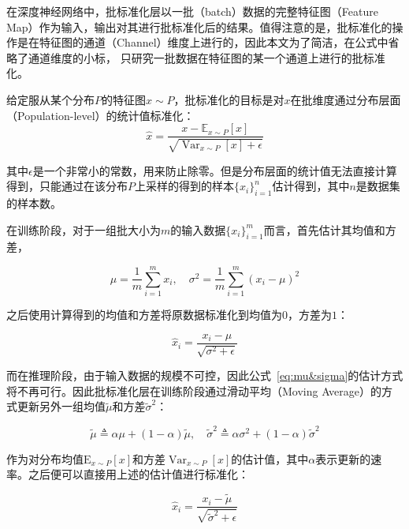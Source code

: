 在深度神经网络中，批标准化层以一批（batch）数据的完整特征图（Feature Map）作为输入，输出对其进行批标准化后的结果。值得注意的是，批标准化的操作是在特征图的通道（Channel）维度上进行的，因此本文为了简洁，在公式中省略了通道维度的小标，
只研究一批数据在特征图的某一个通道上进行的批标准化。

给定服从某个分布$P$的特征图$x\sim P$，批标准化的目标是对$x$在批维度通过分布层面（Population-level）的统计值标准化：
\begin{equation}
  \widehat{x}=\frac{x-\mathbb{E}_{x \sim P}[x]}{\sqrt{\operatorname{Var}_{x \sim P}[x]+\epsilon}}
\end{equation}

其中$\epsilon$是一个非常小的常数，用来防止除零。但是分布层面的统计值无法直接计算得到，只能通过在该分布$P$上采样的得到的样本$\{x_{i}\}_{i=1}^{n}$估计得到，其中$n$是数据集的样本数。 

在训练阶段，对于一组批大小为$m$的输入数据$\{x_{i}\}_{i=1}^{m}$而言，首先估计其均值和方差，

\begin{equation}
    \label{eq:mu&sigma}
    \mu=\frac{1}{m} \sum_{i=1}^{m} x_{i},\quad \sigma^{2}=\frac{1}{m} \sum_{i=1}^{m}\left(x_{i}-\mu\right)^{2}
\end{equation}


之后使用计算得到的均值和方差将原数据标准化到均值为$0$，方差为$1$：

\begin{equation}
  \widehat{x}_{i}=\frac{x_{i}-\mu}{\sqrt{\sigma^{2}+\epsilon}}
\end{equation}
  
而在推理阶段，由于输入数据的规模不可控，因此公式~\ref{eq:mu&sigma}的估计方式将不再可行。因此批标准化层在训练阶段通过滑动平均（Moving Average）的方式更新另外一组均值$\tilde{\mu}$和方差$\tilde{\sigma}^2$：

\begin{equation}
    \tilde{\mu} \triangleq \alpha \mu + (1 - \alpha) \tilde{\mu},\quad \tilde{\sigma}^2 \triangleq \alpha {\sigma}^2 + (1 - \alpha) \tilde{\sigma}^2
\end{equation}

作为对分布均值$\mathrm{E}_{x \sim P}[x]$和方差$\operatorname{Var}_{x \sim P}[x]$的估计值，其中$\alpha$表示更新的速率。之后便可以直接用上述的估计值进行标准化：

\begin{equation}
  \widehat{x}_{i}=\frac{x_{i}-\tilde{\mu}}{\sqrt{\tilde{\sigma}^{2}+\epsilon}}
\end{equation}

